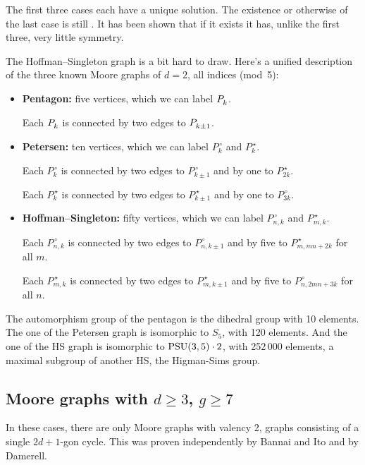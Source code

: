 \documentclass[12pt]{article}
\let\ge\geqslant
\begin{document}
The first three cases each have a unique solution. The existence or otherwise of
the last case is still . It has been shown that if it exists it has, unlike the first three, very little symmetry.

The Hoffman--Singleton graph is a bit hard to draw. Here's a unified
description of the three known Moore graphs of $d=2$, all indices (mod~5):
%
\begin{itemize}

\item {\bf Pentagon:} five vertices, which we can label $P^{\vphantom0}_k$.

      Each $P^{\vphantom0}_k$ is connected by two edges
      to $P^{\vphantom0}_{k\pm1}$.

\item {\bf Petersen:} ten vertices, which we can label
      $P^{\,\circ}_k$ and $P^{\,\star}_k$.

      Each $P^{\,\circ}_k$ is connected by two edges to $P^{\,\circ}_{k\pm1}$
      and by one to $P^{\,\star}_{2k}$.

      Each $P^{\,\star}_k$ is connected by two edges to $P^{\,\star}_{k\pm1}$
      and by one to $P^{\,\circ}_{3k}$.

\item {\bf Hoffman--Singleton:} fifty vertices, which we can label
      $P^{\,\circ}_{n,k}$ and $P^{\,\star}_{m,k}$.

      Each $P^{\,\circ}_{n,k}$ is connected by two edges
      to $P^{\,\circ}_{n,k\pm1}$
      and by five to $P^{\,\star}_{m,mn+2k}$ for all $m$.

      Each $P^{\,\star}_{m,k}$ is connected by two edges
      to $P^{\,\star}_{m,k\pm1}$
      and by five to $P^{\,\circ}_{n,2mn+3k}$ for all $n$.

\end{itemize}
%
The automorphism group of the pentagon is the dihedral group with 10 elements. The one of the Petersen graph is isomorphic to $S_5$, with 120 elements. And the one of the HS graph is isomorphic to $\hbox{PSU}(3,5)\cdot 2$, with 252\,000 elements, a maximal subgroup of another HS, the Higman-Sims group.

\clearpage
\subsection*{Moore graphs with $d\ge3$, $g\ge7$}

In these cases, there are only Moore graphs with valency 2, graphs
consisting of a single $2d+1$-gon cycle. This was proven independently by
Bannai and Ito and by Damerell.
\end{document}
